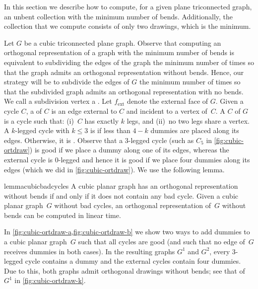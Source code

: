 \documentclass[runningheads]{llncs}
\newcommand{\ext}{\operatorname{ext}}
\let\emph\relax\DeclareTextFontCommand{\emph}{\color{dark blue}\em}
\begin{document}
In this section we describe how to compute, for a given plane
triconnected graph, an unbent collection with the minimum number of
bends.  Additionally, the collection that we compute consists of only
two drawings, which is the minimum.

Let $G$ be a cubic triconnected plane graph. Observe that computing an orthogonal representation of a graph with the minimum number of bends is equivalent to subdividing the edges of the graph the minimum number of times so that the graph admits an orthogonal representation without bends. Hence, our strategy will be to subdivide the edges of $G$ the minimum number of times so that the subdivided graph admits an orthogonal representation with no bends. 
We call a subdivision vertex a \emph{dummy}. %
Let $f_{\ext}$ denote the external face of $G$. Given a cycle $C$, a \emph{leg} of $C$ is an edge external to $C$ and incident to a vertex of~$C$. 
A \emph{$k$-legged cycle} $C$ of $G$ is a cycle such that: (i)~$C$ has exactly $k$ legs, %
and (ii)~no two legs share a vertex. 
A $k$-legged cycle with $k\le 3$ is \emph{bad} if less than $4-k$ dummies are placed along its edges. 
Otherwise, it is \emph{good}. 
Observe that a 3-legged cycle (such as $C_5$ in \cref{fig:cubic-ortdraw}) is good if we place a dummy along one of its edges, whereas the external cycle is $0$-legged and hence it is good if we place four dummies along its edges (which we did in \cref{fig:cubic-ortdraw}). 
We use the following lemma.

\begin{restatable}{lemma}{cubicbadcycles}\cite{DBLP:journals/jgaa/RahmanNN03}
  \label{app-le:cubic-badcycles}
  A cubic planar graph has an orthogonal representation without bends if and only
  if it does not contain any bad cycle.  Given a cubic planar graph~$G$ without bad
  cycles, an orthogonal representation of~$G$ without bends can be computed in linear time.
\end{restatable}

In \cref{fig:cubic-ortdraw-a,fig:cubic-ortdraw-b} we show two ways to add dummies to a cubic planar graph~$G$ such that all cycles are good (and such that no edge of~$G$ receives dummies in both cases). 
In the resulting graphs $G^1$ and $G^2$, every 3-legged cycle contains a dummy and the external cycles contain four dummies. 
Due to this, both graphs admit orthogonal drawings without bends; see that 
of~$G^1$ in \cref{fig:cubic-ortdraw-k}.
\end{document}
